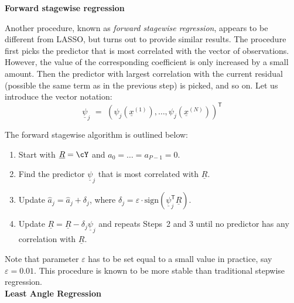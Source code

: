 {  \textbf{Forward stagewise regression} \vspace{2mm}

  Another procedure, known as \emph{forward stagewise regression}, appears to be different from LASSO, but turns out to provide similar results. The procedure first picks the predictor that is most correlated with the vector of observations. However, the value of the corresponding coefficient is only increased by a small amount. Then the predictor with largest correlation with the current residual (possible the same term as in the previous step) is picked, and so on. Let us introduce the vector notation:
  \begin{equation}
    \underline{\psi}_{j} \, \, = \, \, (\psi_{j}(\underline{x}^{(1)}) , \dots, \psi_{j}(\underline{x}^{(N)}) )^{\textsf{T}}
  \end{equation}

  The forward stagewise algorithm is outlined below:
  \begin{enumerate}
  \item Start with $\underline{R} = \cY$ and $a_{0} = \dots = a_{P-1} = 0$.
  \item Find the predictor $\underline{\psi}_{j}$ that is most correlated with $\underline{R}$.
  \item Update $\hat{a}_{j} = \hat{a}_{j} + \delta_{j}$, where $\delta_{j} = \varepsilon \cdot \mbox{sign}(\underline{\psi}_{j}^{\textsf{T}} \underline{R} )$.
  \item Update $\underline{R} =  \underline{R} - \delta_{j} \underline{\psi}_{j}$ and repeats Steps~2 and 3 until no predictor has any correlation with $\underline{R}$.
  \end{enumerate}
  Note that parameter $\varepsilon$ has to be set equal to a small value in practice, say $\varepsilon=0.01$. This procedure is known to be more stable than traditional stepwise regression. \\

  \textbf{Least Angle Regression} \vspace{2mm}

}
